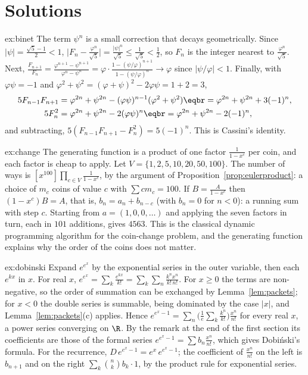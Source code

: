 \section{Solutions}

\begin{solution}{ex:binet}
\idea The term $\psi^n$ is a small correction that decays geometrically.
\writeup Since $|\psi|=\frac{\sqrt5-1}2<1$, $\bigl|F_n-\frac{\varphi^n}{\sqrt5}\bigr|=\frac{|\psi|^n}{\sqrt5}\le\frac1{\sqrt5}<\frac12$, so $F_n$ is the
integer nearest to $\frac{\varphi^n}{\sqrt5}$. Next,
$\frac{F_{n+1}}{F_n}=\frac{\varphi^{n+1}-\psi^{n+1}}{\varphi^n-\psi^n}=\varphi\cdot\frac{1-(\psi/\varphi)^{n+1}}{1-(\psi/\varphi)^n}\to\varphi$ since
$|\psi/\varphi|<1$. Finally, with $\varphi\psi=-1$ and $\varphi^2+\psi^2=(\varphi+\psi)^2-2\varphi\psi=1+2=3$,
\[
\begin{aligned}5F_{n-1}F_{n+1}&=\varphi^{2n}+\psi^{2n}-(\varphi\psi)^{n-1}(\varphi^2+\psi^2)\eqbr=\varphi^{2n}+\psi^{2n}+3(-1)^n,\\
5F_n^2&=\varphi^{2n}+\psi^{2n}-2(\varphi\psi)^n\eqbr=\varphi^{2n}+\psi^{2n}-2(-1)^n,\end{aligned}
\]
and subtracting, $5(F_{n-1}F_{n+1}-F_n^2)=5(-1)^n$. This is Cassini's identity.
\end{solution}

\begin{solution}{ex:change}
\idea The generating function is a product of one factor $\frac1{1-x^c}$ per coin, and each factor is cheap to apply.
\writeup Let $V=\{1,2,5,10,20,50,100\}$. The number of ways is $[x^{100}]\prod_{c\in V}\frac1{1-x^c}$, by the argument of
Proposition~\ref{prop:eulerproduct}: a choice of $m_c$ coins of value $c$ with $\sum cm_c=100$. If $B=\frac A{1-x^c}$ then
$(1-x^c)B=A$, that is, $b_n=a_n+b_{n-c}$ (with $b_n=0$ for $n<0$): a running sum with step $c$. Starting from
$a=(1,0,0,\dots)$ and applying the seven factors in turn, each in $101$ additions, gives $4563$. This is the classical
dynamic programming algorithm for the coin-change problem, and the generating function explains why the order of the
coins does not matter.
\end{solution}

\begin{solution}{ex:dobinski}
\idea Expand $e^{e^x}$ by the exponential series in the outer variable, then each $e^{kx}$ in $x$.
\writeup For real $x$, $e^{e^x}=\sum_k\frac{e^{kx}}{k!}=\sum_k\sum_n\frac{k^nx^n}{k!\,n!}$. For $x\ge0$ the terms are non-negative,
so the order of summation can be exchanged by Lemma~\ref{lem:packets}; for $x<0$ the double series is summable, being
dominated by the case $|x|$, and Lemma~\ref{lem:packets}(c) applies. Hence $e^{e^x-1}=\sum_n\bigl(\frac1e\sum_k\frac{k^n}{k!}\bigr)\frac{x^n}{n!}$ for every
real $x$, a power series converging on $\R$. By the remark at the end of the first section its coefficients are those of the
formal series $e^{e^x-1}=\sum b_n\frac{x^n}{n!}$, which gives Dobi\'nski's formula. For the recurrence,
$D\,e^{e^x-1}=e^x\,e^{e^x-1}$; the coefficient of $\frac{x^n}{n!}$ on the left is $b_{n+1}$ and on the right
$\sum_k\binom nkb_k\cdot1$, by the product rule for exponential series.
\end{solution}

